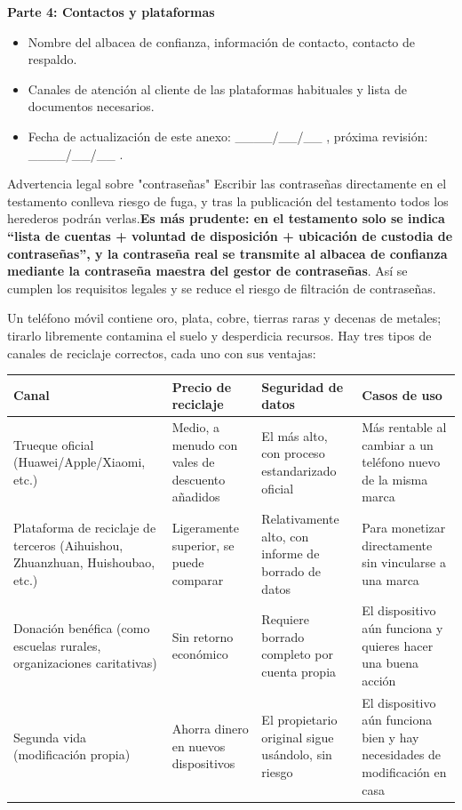 \textbf{Parte 4: Contactos y plataformas}

\begin{itemize}
  \item Nombre del albacea de confianza, información de contacto, contacto de respaldo.
  \item Canales de atención al cliente de las plataformas habituales y lista de documentos necesarios.
  \item Fecha de actualización de este anexo: \_\_\_\_/\_\_/\_\_ , próxima revisión: \_\_\_\_/\_\_/\_\_ .
\end{itemize}

\begin{tcbwarn}{Advertencia legal sobre "contraseñas"}
Escribir las contraseñas directamente en el testamento conlleva riesgo de fuga, y tras la publicación del testamento todos los herederos podrán verlas.\textbf{Es más prudente: en el testamento solo se indica “lista de cuentas + voluntad de disposición + ubicación de custodia de contraseñas”, y la contraseña real se transmite al albacea de confianza mediante la contraseña maestra del gestor de contraseñas}. Así se cumplen los requisitos legales y se reduce el riesgo de filtración de contraseñas.

\end{tcbwarn}


Un teléfono móvil contiene oro, plata, cobre, tierras raras y decenas de metales; tirarlo libremente contamina el suelo y desperdicia recursos. Hay tres tipos de canales de reciclaje correctos, cada uno con sus ventajas:

\begin{center}
\begin{tabularx}{\linewidth}{|X|X|X|X|}
\hline
\textbf{Canal} & \textbf{Precio de reciclaje} & \textbf{Seguridad de datos} & \textbf{Casos de uso} \tabularnewline
\hline
Trueque oficial (Huawei/Apple/Xiaomi, etc.) & Medio, a menudo con vales de descuento añadidos & El más alto, con proceso estandarizado oficial & Más rentable al cambiar a un teléfono nuevo de la misma marca \tabularnewline
Plataforma de reciclaje de terceros (Aihuishou, Zhuanzhuan, Huishoubao, etc.) & Ligeramente superior, se puede comparar & Relativamente alto, con informe de borrado de datos & Para monetizar directamente sin vincularse a una marca \tabularnewline
Donación benéfica (como escuelas rurales, organizaciones caritativas) & Sin retorno económico & Requiere borrado completo por cuenta propia & El dispositivo aún funciona y quieres hacer una buena acción \tabularnewline
Segunda vida (modificación propia) & Ahorra dinero en nuevos dispositivos & El propietario original sigue usándolo, sin riesgo & El dispositivo aún funciona bien y hay necesidades de modificación en casa \tabularnewline
\hline
\end{tabularx}
\end{center}

